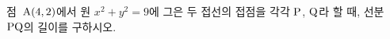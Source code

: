 점~$\mathrm{A}(4{,}\mkern3mu\mathopen{}2)$에서 원 $x^2+y^2=9$에 그은 두 접선의 접점을 각각 $\mathrm{P}$, $\mathrm{Q}$라 할 때, 선분~$\mathrm{PQ}$의 길이를 구하시오.
